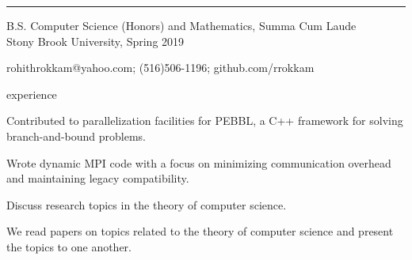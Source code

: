\documentclass{cv}
\begin{document}
\rule{\textwidth}{0.4pt}
\begin{center}
B.S. Computer Science (Honors) and Mathematics, Summa Cum Laude \\
Stony Brook University, Spring 2019

rohithrokkam@yahoo.com; (516)506-1196; github.com/rrokkam 

\end{center}


\begin{cvsection}{experience}
  {
    \item Contributed to parallelization facilities for PEBBL, a C++ framework for solving branch-and-bound problems. 
    \item Wrote dynamic MPI code with a focus on minimizing communication overhead and maintaining legacy compatibility.
  }
  {
    \item Discuss research topics in the theory of computer science.
    \item We read papers on topics related to the theory of computer science and present the topics to one another.
   }
\end{cvsection}
\end{document}
